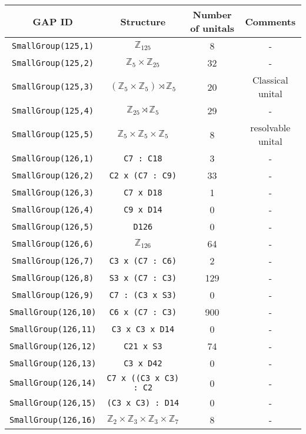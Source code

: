 \documentclass{amsart}
\theoremstyle{plain}
\theoremstyle{definition}
\theoremstyle{remark}
\begin{document}
\begin{center}
\begin{tabular}{||c c c c||}
 \hline
 GAP ID & Structure & Number of unitals & Comments \\ [0.5ex]
 \hline\hline
 {\tt SmallGroup(125,1)} & $\mathbb Z_{125}$ & 8 & - \\
 {\tt SmallGroup(125,2)} & $\mathbb Z_5 \times \mathbb Z_{25}$ & 32 & - \\
 {\tt SmallGroup(125,3)} & $(\mathbb Z_5 \times \mathbb Z_5) \rtimes \mathbb Z_5$ & 20 & Classical unital \\
 {\tt SmallGroup(125,4)} & $\mathbb Z_{25} \rtimes \mathbb Z_5$ & 29 & - \\
 {\tt SmallGroup(125,5)} & $\mathbb Z_5 \times \mathbb Z_5 \times \mathbb Z_5$ & 8 & \cite{HoCD} resolvable unital \\
 \hline\hline
 {\tt SmallGroup(126,1)} & {\tt C7 : C18} & 3 & - \\
 {\tt SmallGroup(126,2)} & {\tt C2 x (C7 : C9)} & 33 & - \\
 {\tt SmallGroup(126,3)} & {\tt C7 x D18} & 1 & - \\
 {\tt SmallGroup(126,4)} & {\tt C9 x D14} & 0 & - \\
 {\tt SmallGroup(126,5)} & {\tt D126} & 0 & - \\
 {\tt SmallGroup(126,6)} & $\mathbb Z_{126}$ & 64 & - \\
 {\tt SmallGroup(126,7)} & {\tt C3 x (C7 : C6)} & 2 & - \\
 {\tt SmallGroup(126,8)} & {\tt S3 x (C7 : C3)} & 129 & - \\
 {\tt SmallGroup(126,9)} & {\tt C7 : (C3 x S3)} & 0 & - \\
 {\tt SmallGroup(126,10)} & {\tt C6 x (C7 : C3)} & 900 & - \\
 {\tt SmallGroup(126,11)} & {\tt C3 x C3 x D14} & 0 & - \\
 {\tt SmallGroup(126,12)} & {\tt C21 x S3} & 74 & - \\
 {\tt SmallGroup(126,13)} & {\tt C3 x D42} & 0 & - \\
 {\tt SmallGroup(126,14)} & {\tt C7 x ((C3 x C3) : C2} & 0 & - \\
 {\tt SmallGroup(126,15)} & {\tt (C3 x C3) : D14} & 0 & - \\
 {\tt SmallGroup(126,16)} & $\mathbb Z_2 \times \mathbb Z_3 \times \mathbb Z_3 \times \mathbb Z_7$ & 8 & - \\
 \hline
\end{tabular}
\end{center}
\end{document}
